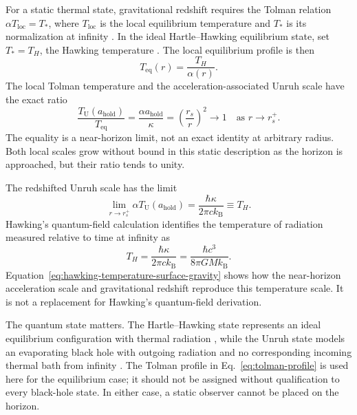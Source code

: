 \documentclass[12pt]{article}
\begin{document}
For a static thermal state, gravitational redshift requires the Tolman relation $\alpha T_{\mathrm{loc}}=T_*$, where $T_{\mathrm{loc}}$ is the local equilibrium temperature and $T_*$ is its normalization at infinity \cite{Tolman,TolmanEhrenfest}. In the ideal Hartle--Hawking equilibrium state, set $T_*=T_H$, the Hawking temperature \cite{Hawking,HartleHawking}. The local equilibrium profile is then
\begin{equation}
  T_{\mathrm{eq}}(r)=\frac{T_H}{\alpha(r)}.
  \label{eq:tolman-profile}
\end{equation}
The local Tolman temperature and the acceleration-associated Unruh scale have the exact ratio
\begin{equation}
  \frac{T_{\mathrm U}(a_{\mathrm{hold}})}{T_{\mathrm{eq}}}
  =\frac{\alpha a_{\mathrm{hold}}}{\kappa}
  =\left(\frac{r_s}{r}\right)^2
  \longrightarrow1
  \quad\text{as }r\to r_s^+.
  \label{eq:near-horizon-temperature-ratio}
\end{equation}
The equality is a near-horizon limit, not an exact identity at arbitrary radius. Both local scales grow without bound in this static description as the horizon is approached, but their ratio tends to unity.

The redshifted Unruh scale has the limit
\begin{equation}
  \lim_{r\to r_s^+}\alpha T_{\mathrm U}(a_{\mathrm{hold}})
  =\frac{\hbar\kappa}{2\pi c k_{\mathrm B}}
  \equiv T_H.
  \label{eq:hawking-temperature-surface-gravity}
\end{equation}
Hawking's quantum-field calculation identifies the temperature of radiation measured relative to time at infinity as \cite{Hawking}
\begin{equation}
  T_H
  =\frac{\hbar\kappa}{2\pi c k_{\mathrm B}}
  =\frac{\hbar c^3}{8\pi G M k_{\mathrm B}}.
  \label{eq:hawking-temperature}
\end{equation}
Equation~\eqref{eq:hawking-temperature-surface-gravity} shows how the near-horizon acceleration scale and gravitational redshift reproduce this temperature scale. It is not a replacement for Hawking's quantum-field derivation.

The quantum state matters. The Hartle--Hawking state represents an ideal equilibrium configuration with thermal radiation \cite{HartleHawking}, while the Unruh state models an evaporating black hole with outgoing radiation and no corresponding incoming thermal bath from infinity \cite{Unruh}. The Tolman profile in Eq.~\eqref{eq:tolman-profile} is used here for the equilibrium case; it should not be assigned without qualification to every black-hole state. In either case, a static observer cannot be placed on the horizon.
\end{document}
